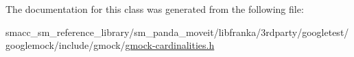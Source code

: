 The documentation for this class was generated from the following file\+:\begin{DoxyCompactItemize}
\item 
smacc\+\_\+sm\+\_\+reference\+\_\+library/sm\+\_\+panda\+\_\+moveit/libfranka/3rdparty/googletest/googlemock/include/gmock/\hyperlink{gmock-cardinalities_8h}{gmock-\/cardinalities.\+h}\end{DoxyCompactItemize}
